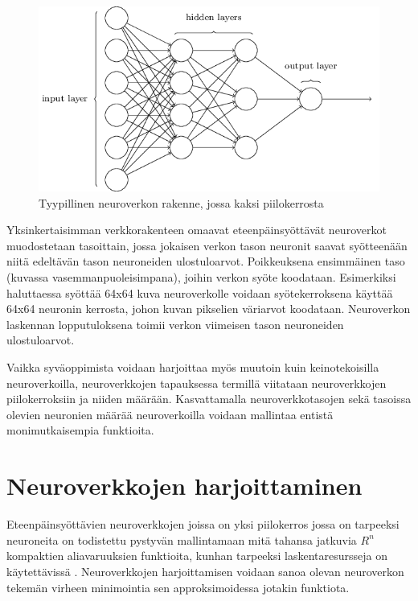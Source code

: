 \documentclass[finnish]{tktltiki2}
\theoremstyle{definition}
\theoremstyle{remark}
\begin{document}
  \begin{figure}[h]
  \label{pic:neuralnet}
  \centering
  \includegraphics[scale=0.5]{basic-neuralnet}
  \caption{Tyypillinen neuroverkon rakenne, jossa kaksi piilokerrosta \cite{Nielsen-neural}}
  \end{figure}

  Yksinkertaisimman verkkorakenteen omaavat eteenpäinsyöttävät neuroverkot muodostetaan tasoittain, jossa jokaisen verkon tason neuronit saavat syötteenään niitä edeltävän tason neuroneiden ulostuloarvot. Poikkeuksena ensimmäinen taso (kuvassa vasemmanpuoleisimpana), joihin verkon syöte koodataan. Esimerkiksi haluttaessa syöttää 64x64 kuva neuroverkolle voidaan syötekerroksena käyttää 64x64 neuronin kerrosta, johon kuvan pikselien väriarvot koodataan. Neuroverkon laskennan lopputuloksena toimii verkon viimeisen tason neuroneiden ulostuloarvot.

  Vaikka syväoppimista voidaan harjoittaa myös muutoin kuin keinotekoisilla neuroverkoilla, neuroverkkojen tapauksessa termillä viitataan neuroverkkojen piilokerroksiin ja niiden määrään. Kasvattamalla neuroverkkotasojen sekä tasoissa olevien neuronien määrää neuroverkoilla voidaan mallintaa entistä monimutkaisempia funktioita.

  \section{Neuroverkkojen harjoittaminen}

  Eteenpäinsyöttävien neuroverkkojen joissa on yksi piilokerros jossa on tarpeeksi neuroneita on todistettu pystyvän mallintamaan mitä tahansa jatkuvia $R^n$ kompaktien aliavaruuksien funktioita, kunhan tarpeeksi laskentaresursseja on käytettävissä \cite{multilayer-feedforward-universal-approximators}. Neuroverkkojen harjoittamisen voidaan sanoa olevan neuroverkon tekemän virheen minimointia sen approksimoidessa jotakin funktiota.
\end{document}
